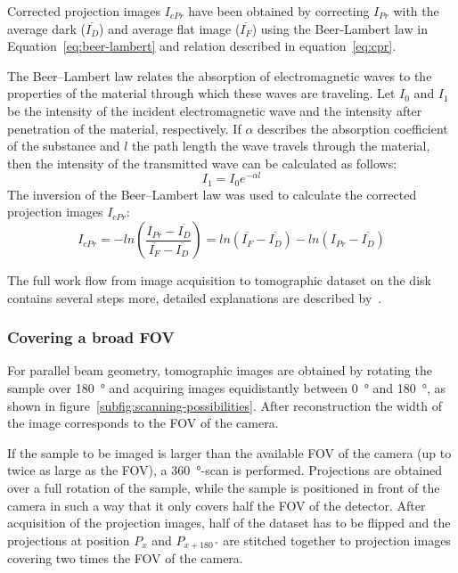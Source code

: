 Corrected projection images $I_{cPr}$ have been obtained by correcting $I_{Pr}$ with the average dark ($\overline{I_{D}}$) and average flat image ($\overline{I_{F}}$) using the Beer-Lambert law in Equation~\ref{eq:beer-lambert} and relation described in equation~\ref{eq:cpr}.

The Beer--Lambert law relates the absorption of electromagnetic waves to the properties of the material through which these waves are traveling. Let $I_{0}$ and $I_{1}$ be the intensity of the incident electromagnetic wave and the intensity after penetration of the material, respectively. If $\alpha$ describes the absorption coefficient of the substance and $l$ the path length the wave travels through the material, then the intensity of the transmitted wave can be calculated as follows:
\begin{equation}
	I_{1}=I_{0}e^{-\alpha l}
\label{eq:beer-lambert}
\end{equation}
The inversion of the Beer--Lambert law was used to calculate the corrected projection images $I_{cPr}$:
\begin{equation}
	I_{cPr} = -ln\left(\frac{I_{Pr}-\overline{I_{D}}}{\overline{I_{F}}-\overline{I_{D}}}\right)
	= ln(\overline{I_{F}}-\overline{I_{D}})-ln(I_{Pr}-\overline{I_{D}})
	\label{eq:cpr}
\end{equation}
\cbend

The full work flow from image acquisition to tomographic dataset on the disk contains several steps more, detailed explanations are described by~\citet{Hintermueller2009}.

\subsubsection{Covering a broad FOV}
\label{subsec:covering a broad fov}
For parallel beam geometry, tomographic images are obtained by rotating the sample over \SI{180}{\degree} and acquiring images equidistantly between \SI{0}{\degree} and \SI{180}{\degree}, as shown in figure~\ref{subfig:scanning-possibilities}. After reconstruction the width of the image corresponds to the FOV of the camera.

If the sample to be imaged is larger than the available FOV of the camera (up to twice as large as the FOV), a \SI{360}{\degree}-scan is performed. Projections are obtained over a full rotation of the sample, while the sample is positioned in front of the camera in such a way that it only covers half the FOV of the detector. After acquisition of the projection images, half of the dataset has to be flipped and the projections at position $P_{x}$ and $P_{x+\SI{180}{\degree}}$ are stitched together to projection images covering two times the FOV of the camera.

